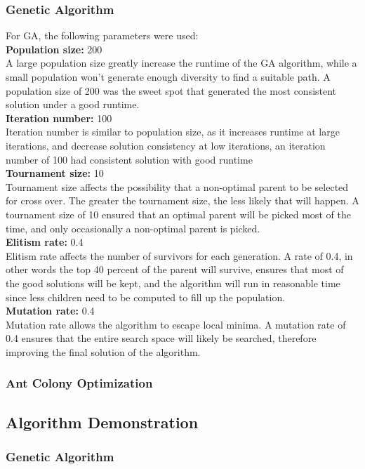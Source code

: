 \documentclass[conference]{IEEEtran}
\begin{document}
\subsubsection{Genetic Algorithm}
For GA, the following parameters were used:\\
\textbf{Population size: } 200 \\
A large population size greatly increase the runtime of the GA algorithm, while a small population won't generate enough diversity to find a suitable path. A population size of 200 was the sweet spot that generated the most consistent solution under a good runtime.\\
\textbf{Iteration number: } 100 \\
Iteration number is similar to population size, as it increases runtime at large iterations, and decrease solution consistency at low iterations, an iteration number of 100 had consistent solution with good runtime \\
\textbf{Tournament size: } 10 \\
Tournament size affects the possibility that a non-optimal parent to be selected for cross over. The greater the tournament size, the less likely that will happen. A tournament size of 10 ensured that an optimal parent will be picked most of the time, and only occasionally a non-optimal parent is picked.\\
\textbf{Elitism rate: } 0.4 \\
Elitism rate affects the number of survivors for each generation. A rate of 0.4, in other words the top 40 percent of the parent will survive, ensures that most of the good solutions will be kept, and the algorithm will run in reasonable time since less children need to be computed to fill up the population.\\
\textbf{Mutation rate: } 0.4 \\
Mutation rate allows the algorithm to escape local minima. A mutation rate of 0.4 ensures that the entire search space will likely be searched, therefore improving the final solution of the algorithm.
\subsubsection{Ant Colony Optimization}

\subsection{Algorithm Demonstration}
\subsubsection{Genetic Algorithm}
\end{document}
